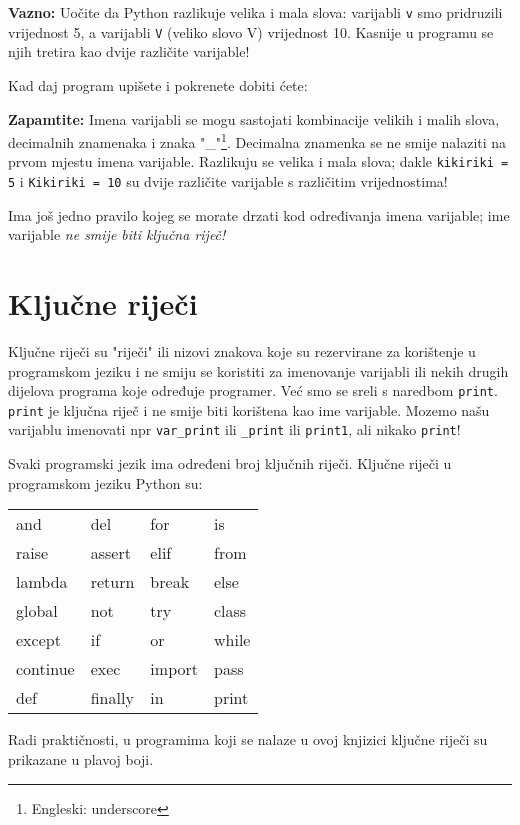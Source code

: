 	\textbf{Vazno:} Uočite da Python razlikuje velika i mala
	slova: varijabli \verb+v+ smo
	pridruzili vrijednost 5, a varijabli \verb+V+ (veliko slovo V) vrijednost 10.
	Kasnije u programu se njih tretira kao dvije različite varijable!

	Kad daj program upišete i pokrenete dobiti ćete:


	\textbf{Zapamtite:} Imena varijabli se mogu sastojati kombinacije velikih i malih
	slova, decimalnih znamenaka
	i znaka "\_"\footnote{Engleski: underscore}. Decimalna znamenka se ne smije
	nalaziti na prvom mjestu imena varijable. Razlikuju se velika i mala slova; dakle
	\verb+kikiriki = 5+ i \verb+Kikiriki = 10+ su dvije različite varijable s
	različitim vrijednostima! 

	Ima još jedno pravilo kojeg se morate drzati kod određivanja imena
	varijable; ime varijable \emph{ne smije biti ključna riječ!}

\section{Ključne riječi}

	Ključne riječi su "riječi" ili nizovi znakova koje su rezervirane za
	korištenje u programskom jeziku i ne smiju se koristiti za imenovanje varijabli
	ili nekih drugih dijelova programa koje određuje programer. Već smo se
	sreli s  naredbom \verb+print+. \verb+print+ je ključna riječ i ne smije
	biti korištena kao ime varijable. Mozemo našu varijablu imenovati npr
	\verb+var_print+ ili \verb+_print+ ili \verb+print1+, ali nikako \verb+print+!

	Svaki programski jezik ima određeni broj ključnih riječi. Ključne
	riječi u programskom jeziku Python su:

\begin{center}
\begin{tabular}{llll}
and & del & for & is \\
raise & assert & elif & from\\
lambda & return & break & else\\
global & not & try & class\\
except & if & or & while\\
continue & exec & import & pass\\
def & finally & in & print
\end{tabular}
\end{center}

	Radi praktičnosti, u programima koji se nalaze u ovoj knjizici ključne
	riječi su prikazane u plavoj boji.


